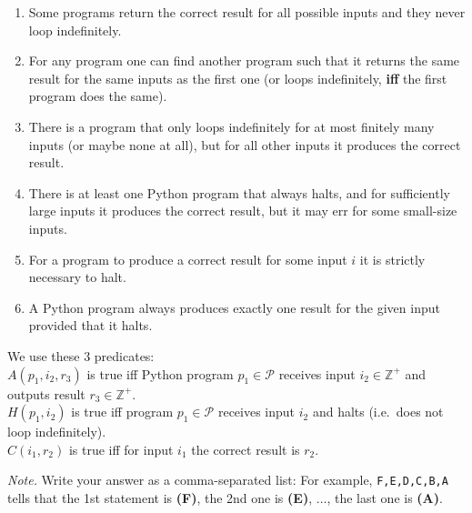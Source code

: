 \documentclass[jou]{apa6}
\begin{document}
\begin{enumerate}
\item Some programs return the correct result for all possible inputs and 
they never loop indefinitely.
\item For any program one can find another program such that it returns
the same result for the same inputs as the first one (or loops indefinitely, 
{\color{red} \bf iff} the first program does the same).
\item There is a program that only loops indefinitely for at most finitely many inputs (or maybe none at all), 
but for all other inputs it produces the correct result.
\item There is at least one Python program that always halts, and for sufficiently large inputs it produces
the correct result, but it may err for some small-size inputs.
\item For a program to produce a correct result for some input $i$ it is strictly necessary to halt.\\
\item A Python program always produces exactly one result for the given input provided that it halts.
\end{enumerate}

We use these $3$ predicates:\\
$A(p_1,i_2,r_3)$ is true iff
Python program $p_1 \in \mathcal{P}$ receives input $i_2 \in \mathbb{Z}^{+}$ and outputs 
result $r_3 \in \mathbb{Z}^{+}$.\\
$H(p_1,i_2)$ is true iff program $p_1 \in \mathcal{P}$ receives input $i_2$ and halts (i.e.\ does not
loop indefinitely).\\
$C(i_1,r_2)$ is true iff for input $i_1$ the correct result is $r_2$. 

{\em Note.} Write your answer as a comma-separated list: For example, 
{\tt F,E,D,C,B,A} tells that the 1st statement is {\bf (F)}, the 2nd one
is {\bf (E)}, $\ldots$, the last one is {\bf (A)}.
\end{document}

